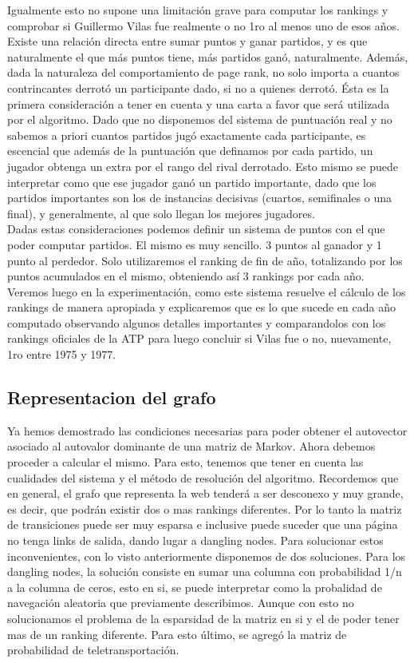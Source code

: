 Igualmente esto no supone una limitación grave para computar los rankings y comprobar si Guillermo Vilas fue realmente o no 1ro al menos uno de esos años.
\\
Existe una relación directa entre sumar puntos y ganar partidos, y es que naturalmente el que más puntos tiene, más partidos ganó, naturalmente.
Además, dada la naturaleza del comportamiento de page rank, no solo importa a cuantos contrincantes derrotó un participante dado, si no a quienes derrotó. Ésta es la primera consideración a tener en cuenta y una carta a favor que será utilizada por el algoritmo. Dado que no disponemos del sistema de puntuación real y no sabemos a priori cuantos partidos jugó exactamente cada participante, es escencial que además de la puntuación que definamos por cada partido, un jugador obtenga un extra por el rango del rival derrotado. Esto mismo se puede interpretar como que ese jugador ganó un partido importante, dado que los partidos importantes son los de instancias decisivas (cuartos, semifinales o una final), y generalmente, al que solo llegan los mejores jugadores.    
\\
Dadas estas consideraciones podemos definir un sistema de puntos con el que poder computar partidos. El mismo es muy sencillo. 3 puntos al ganador y 1 punto al perdedor. Solo utilizaremos el ranking de fin de año, totalizando por los puntos acumulados en el mismo, obteniendo así 3 rankings por cada año.
\\
Veremos luego en la experimentación, como este sistema resuelve el cálculo de los rankings de manera apropiada y explicaremos que es lo que sucede en cada año computado observando algunos detalles importantes y comparandolos con los rankings oficiales de la ATP para luego concluir si Vilas fue o no, nuevamente, 1ro entre 1975 y 1977.
 		 				
\subsection{Representacion del grafo}

Ya hemos demostrado las condiciones necesarias para poder obtener el autovector asociado al autovalor dominante de una matriz de Markov. 
Ahora debemos proceder a calcular el mismo. Para esto, tenemos que tener en cuenta las cualidades del sistema y el método de resolución del algoritmo. Recordemos que en general, el grafo que representa la web tenderá a ser desconexo y muy grande, es decir, que podrán existir dos o mas rankings diferentes. Por lo tanto la matriz 
de transiciones puede ser muy esparsa e inclusive puede suceder que una página no tenga links de salida, dando lugar a dangling nodes. Para solucionar estos inconvenientes, con lo visto anteriormente disponemos de dos soluciones. Para los dangling nodes, la solución consiste en sumar una columna con probabilidad 1/n a la columna de ceros, esto en si, se puede interpretar como la probalidad de navegación aleatoria que previamente describimos. Aunque con esto no solucionamos el problema de la esparsidad de la matriz en si y el de poder tener mas de un ranking diferente. Para esto último, se agregó la matriz de probabilidad de teletransportación.

